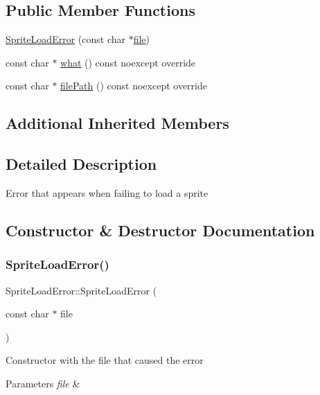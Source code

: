 \subsection*{Public Member Functions}
\begin{DoxyCompactItemize}
\item 
\hyperlink{classSpriteLoadError_a28b49ab4f2fb92283d272c25a3582994}{Sprite\+Load\+Error} (const char $\ast$\hyperlink{classFileError_a0ea1cc225bf7f8fa47aa0cfa0c2ba685}{file})
\item 
const char $\ast$ \hyperlink{classSpriteLoadError_a7b51c2ea656c91b352514cd77aab0a38}{what} () const noexcept override
\item 
const char $\ast$ \hyperlink{classSpriteLoadError_aa6c6ca97b781b8045eb4271aad6aa6d1}{file\+Path} () const noexcept override
\end{DoxyCompactItemize}
\subsection*{Additional Inherited Members}


\subsection{Detailed Description}
Error that appears when failing to load a sprite 

\subsection{Constructor \& Destructor Documentation}
\mbox{\label{classSpriteLoadError_a28b49ab4f2fb92283d272c25a3582994}} 
\subsubsection{\texorpdfstring{Sprite\+Load\+Error()}{SpriteLoadError()}}
{\footnotesize\ttfamily Sprite\+Load\+Error\+::\+Sprite\+Load\+Error (\begin{DoxyParamCaption}\item[{const char $\ast$}]{file }\end{DoxyParamCaption})}

Constructor with the file that caused the error 
\begin{DoxyParams}{Parameters}
{\em file} & \\
\hline
\end{DoxyParams}


